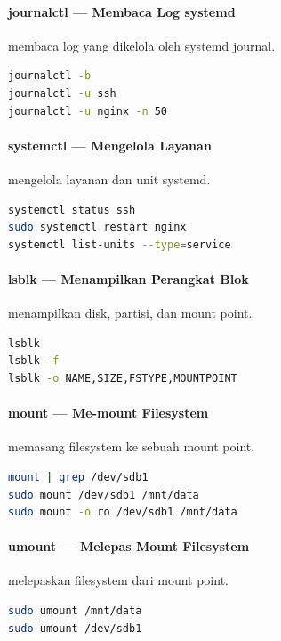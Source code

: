 \paragraph*{journalctl --- Membaca Log systemd}
 membaca log yang dikelola oleh systemd journal.
\begin{lstlisting}[language=bash]
journalctl -b
journalctl -u ssh
journalctl -u nginx -n 50
\end{lstlisting}

\paragraph*{systemctl --- Mengelola Layanan}
 mengelola layanan dan unit systemd.
\begin{lstlisting}[language=bash]
systemctl status ssh
sudo systemctl restart nginx
systemctl list-units --type=service
\end{lstlisting}

\paragraph*{lsblk --- Menampilkan Perangkat Blok}
 menampilkan disk, partisi, dan mount point.
\begin{lstlisting}[language=bash]
lsblk
lsblk -f
lsblk -o NAME,SIZE,FSTYPE,MOUNTPOINT
\end{lstlisting}

\paragraph*{mount --- Me-mount Filesystem}
 memasang filesystem ke sebuah mount point.
\begin{lstlisting}[language=bash]
mount | grep /dev/sdb1
sudo mount /dev/sdb1 /mnt/data
sudo mount -o ro /dev/sdb1 /mnt/data
\end{lstlisting}

\paragraph*{umount --- Melepas Mount Filesystem}
 melepaskan filesystem dari mount point.
\begin{lstlisting}[language=bash]
sudo umount /mnt/data
sudo umount /dev/sdb1
\end{lstlisting}
